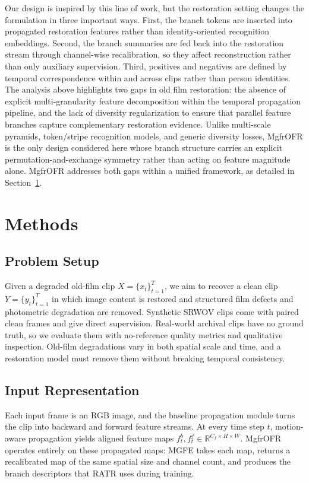 \documentclass[symmetry,article,submit,pdftex,moreauthors]{Definitions/mdpi}
\begin{document}
Our design is inspired by this line of work, but the restoration setting changes the formulation in three important ways. First, the branch tokens are inserted into propagated restoration features rather than identity-oriented recognition embeddings. Second, the branch summaries are fed back into the restoration stream through channel-wise recalibration, so they affect reconstruction rather than only auxiliary supervision. Third, positives and negatives are defined by temporal correspondence within and across clips rather than person identities. The analysis above highlights two gaps in old film restoration: the absence of explicit multi-granularity feature decomposition within the temporal propagation pipeline, and the lack of diversity regularization to ensure that parallel feature branches capture complementary restoration evidence. Unlike multi-scale pyramids, token/stripe recognition models, and generic diversity losses, MgfrOFR is the only design considered here whose branch structure carries an explicit permutation-and-exchange symmetry rather than acting on feature magnitude alone. MgfrOFR addresses both gaps within a unified framework, as detailed in Section~\ref{sec:method}.
\section{Methods}
\label{sec:method}

\subsection{Problem Setup}
\label{subsec:problem_setup}

Given a degraded old-film clip $X=\{x_t\}_{t=1}^{T}$, we aim to recover a clean clip $Y=\{y_t\}_{t=1}^{T}$ in which image content is restored and structured film defects and photometric degradation are removed. Synthetic SRWOV clips come with paired clean frames and give direct supervision. Real-world archival clips have no ground truth, so we evaluate them with no-reference quality metrics and qualitative inspection. Old-film degradations vary in both spatial scale and time, and a restoration model must remove them without breaking temporal consistency.

\subsection{Input Representation}
\label{subsec:input_representation}

Each input frame is an RGB image, and the baseline propagation module turns the clip into backward and forward feature streams. At every time step $t$, motion-aware propagation yields aligned feature maps $f_t^{b}, f_t^{f} \in \mathbb{R}^{C_f \times H \times W}$. MgfrOFR operates entirely on these propagated maps: MGFE takes each map, returns a recalibrated map of the same spatial size and channel count, and produces the branch descriptors that RATR uses during training.
\end{document}
